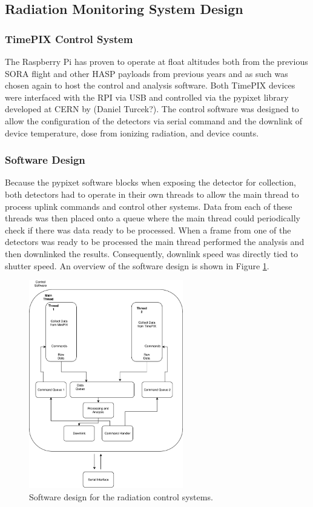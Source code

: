\subsection{Radiation Monitoring System Design}
\label{sec:Radiation Design}
\subsubsection{TimePIX Control System}
The Raspberry Pi has proven to operate at float altitudes both from the previous SORA flight and other HASP payloads from previous years and as such was chosen again to host the control and analysis software. Both TimePIX devices were interfaced with the RPI via USB and controlled via the pypixet library developed at CERN by (Daniel Turcek?). The control software was designed to allow the configuration of the detectors via serial command and the downlink of device temperature, dose from ionizing radiation, and device counts. 
\subsubsection{Software Design}
Because the pypixet software blocks when exposing the detector for collection, both detectors had to operate in their own threads to allow the main thread to process uplink commands and control other systems. Data from each of these threads was then placed onto a queue where the main thread could periodically check if there was data ready to be processed. When a frame from one of the detectors was ready to be processed the main thread performed the analysis and then downlinked the results. Consequently, downlink speed was directly tied to shutter speed. An overview of the software design is shown in Figure \ref{softwaredesign}.
\begin{figure}[h!]
	\begin{center}
	\includegraphics[width=0.6\textwidth]{figures/SoftwareDesign.pdf}
	\caption{Software design for the radiation control systems.}
	\label{softwaredesign}
	\end{center}
\end{figure}
